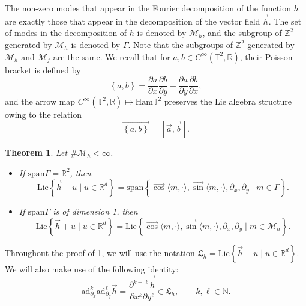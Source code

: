 \documentclass[10pt]{article}
\newcommand{\p}{\partial}
\newcommand{\R}{{\mathbb R}}
\newcommand{\T}{{\mathbb T}}
\newcommand{\N}{{\mathbb N}}
\newcommand{\Z}{{\mathbb Z}}
\newcommand{\M}{{\mathcal M}}
\newcommand{\la}{\langle}
\newcommand{\ra}{\rangle}
\newcommand{\ad}{\text{ad}}
\newcommand{\f}{\overrightarrow}
\newtheorem{theorem}{Theorem}
\begin{document}
The non-zero modes that appear in the Fourier decomposition of the function $h$ are exactly those that appear in the decomposition of the vector field $\f{h}$. The set of modes in the decomposition of $h$ is denoted by $\M_h$, and the subgroup of $\Z^2$ generated by $\M_h$ is denoted by $\Gamma$. Note that the subgroups of $\Z^2$ generated by $\M_h$ and $\M_f$ are the same.  We recall that for $a,b \in C^{\infty}(\T^2,\R)$, their Poisson bracket is defined by 
\begin{equation*}
    \left\{a,b\right\}=\frac{\p a}{\p x}\frac{\p b}{\p y}- \frac{\p a}{\p y}\frac{\p b}{\p x},
\end{equation*}
and the arrow map $C^{\infty}(\T^2,\R)\mapsto \mathrm{Ham}\T^2$ preserves the Lie algebra structure owing to the relation 
\begin{equation*}
    \f{ \left\{ a,b \right\}}=\left[ \f{a},\f{b} \right].
\end{equation*}
\begin{theorem} \label{theorem : algebra dim2} 
Let $\# \M_h < \infty$. 

\begin{itemize}
    \item If $\mathrm{span} \Gamma=\R^2$, then 
    \begin{equation*}
        \mathrm{Lie}\left\{\f{h}+u\mid u \in \R^d\right\} = \mathrm{span} \left\{ \f{\cos}\la m, \cdot \ra, \f{\sin}\la m, \cdot \ra,\p_x,\p_y \mid m \in \Gamma  \right\}.
    \end{equation*}
    \item If $\mathrm{span} \Gamma$ is of dimension 1, then
    \begin{equation*}
        \mathrm{Lie}\left\{\f{h}+u\mid u \in \R^d\right\} = \mathrm{Lie} \left\{ \f{\cos}\la m, \cdot \ra, \f{\sin}\la m, \cdot \ra,\p_x,\p_y \mid m \in \M_h  \right\}.
    \end{equation*}
\end{itemize}
\end{theorem}

Throughout the proof of \cref{theorem : algebra dim2}, we will use the notation $\mathfrak L_h = \mathrm{Lie}\left\{\f{h}+u \mid u \in \R^d\right\}$. We will also make use of the following identity: 
\begin{equation}\label{eqn:lemma derivation}
        \ad_{\p_x}^k\ad_{\p_y}^\ell\f{h}=\f{\frac{\p^{k+\ell}h}{\p x^k\p y^\ell}} \in \mathfrak{L}_h,\qquad  k,\ell\in \N.
\end{equation}
    
\end{document}
